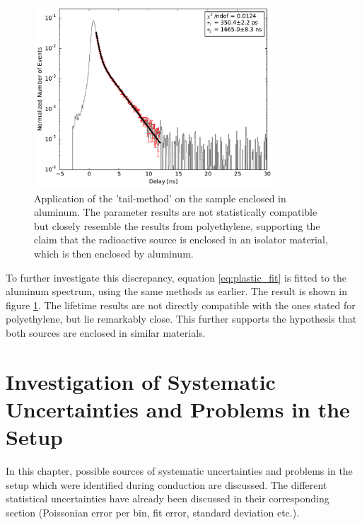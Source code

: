 \documentclass[
	paper=A4,
	parskip=full,
	chapterprefix=true,
	11pt,
	headings=normal,
	bibliography=totoc,
	listof=totoc,
	titlepage=on,
]{scrreprt}
\begin{document}
\begin{figure}
	\centering
	\includegraphics[width=0.8\textwidth]{na22_aluminum_fit}
	\caption{Application of the 'tail-method' on the  sample enclosed in aluminum. The parameter results are not statistically compatible but closely resemble the results from polyethylene, supporting the claim that the radioactive source is enclosed in an isolator material, which is then enclosed by aluminum.}
	\label{fig:na22_alu_fit}
\end{figure}

To further investigate this discrepancy, equation \ref{eq:plastic_fit} is fitted to the aluminum spectrum, using the same methods as earlier. The result is shown in figure \ref{fig:na22_alu_fit}. The lifetime results are not directly compatible with the ones stated for polyethylene, but lie remarkably close. This further supports the hypothesis that both  sources are enclosed in similar materials.

\chapter{Investigation of Systematic Uncertainties and Problems in the Setup}

In this chapter, possible sources of systematic uncertainties and problems in the setup which were identified during conduction are discussed. The different statistical uncertainties have already been discussed in their corresponding section (Poissonian error per bin, fit error, standard deviation etc.).
\end{document}
